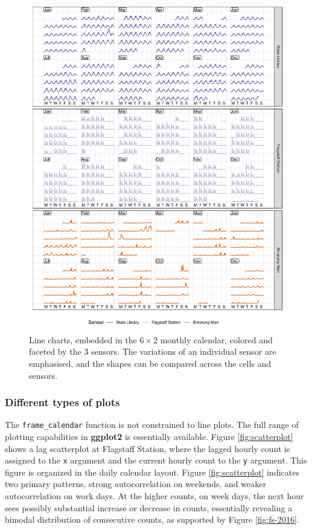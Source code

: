 \documentclass[12pt]{article}
\begin{document}
\begin{figure}

{\centering \includegraphics[width=\textwidth]{figure/facet-1} 

}

\caption{Line charts, embedded in the \(6 \times 2\) monthly calendar, colored and faceted by the 3 sensors. The variations of an individual sensor are emphasised, and the shapes can be compared across the cells and sensors.}\label{fig:facet}
\end{figure}



\hypertarget{different-types-of-plots}{%
\subsubsection{Different types of plots}\label{different-types-of-plots}}

The \texttt{frame\_calendar} function is not constrained to line plots. The full range of plotting capabilities in \textbf{ggplot2} is essentially available. Figure \ref{fig:scatterplot} shows a lag scatterplot at Flagstaff Station, where the lagged hourly count is assigned to the \texttt{x} argument and the current hourly count to the \texttt{y} argument. This figure is organized in the daily calendar layout. Figure \ref{fig:scatterplot} indicates two primary patterns, strong autocorrelation on weekends, and weaker autocorrelation on work days. At the higher counts, on week days, the next hour sees possibly substantial increase or decrease in counts, essentially revealing a bimodal distribution of consecutive counts, as supported by Figure \ref{fig:fs-2016}.
\end{document}
